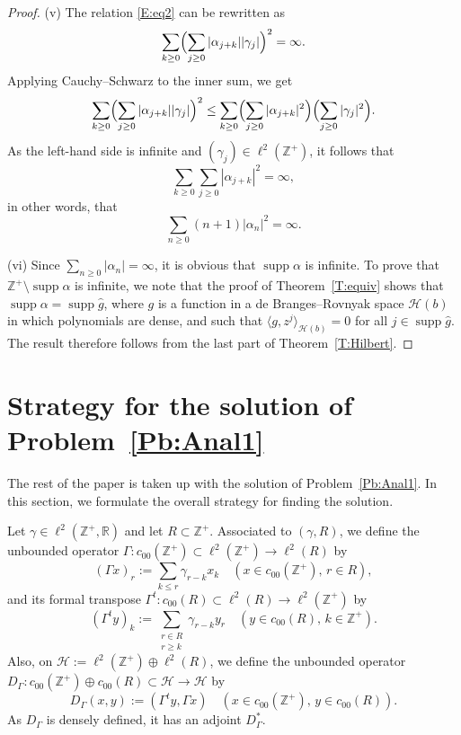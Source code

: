 \documentclass[11pt,reqno]{amsart}
\theoremstyle{plain}
\theoremstyle{definition}
\theoremstyle{remark}
\newcommand{\cH}{\mathcal{H}}
\newcommand{\RR}{\mathbb{R}}
\newcommand{\ZZ}{\mathbb{Z}}
\renewcommand{\hat}{\widehat}
\DeclareMathOperator{\supp}{supp}
\begin{document}
\begin{proof}
(v)  The relation \eqref{E:eq2} can be rewritten as
\[
\sum_{k\ge0}\Bigl(\sum_{j\ge0}|\alpha_{j+k}||\gamma_j|\Bigr)^2=\infty.
\]
Applying Cauchy--Schwarz to the inner sum, we get
\[
\sum_{k\ge0}\Bigl(\sum_{j\ge0}|\alpha_{j+k}||\gamma_j|\Bigr)^2
\le
\sum_{k\ge0}\Bigl(\sum_{j\ge0}|\alpha_{j+k}|^2\Bigr)\Bigl(\sum_{j\ge0}|\gamma_j|^2\Bigr).
\]
As the left-hand side is infinite and  $(\gamma_j)\in\ell^2(\ZZ^+)$,
it follows that
\[
\sum_{k\ge0}\sum_{j\ge0}|\alpha_{j+k}|^2=\infty,
\]
in other words, that
\[
\sum_{n\ge0}(n+1)|\alpha_{n}|^2=\infty.
\]

 
(vi) Since $\sum_{n\ge0}|\alpha_n|=\infty$, it is obvious that $\supp\alpha$ is infinite.
To prove that $\ZZ^+\setminus\supp\alpha$ is infinite,
we note that the proof of Theorem~\ref{T:equiv} shows that
$\supp\alpha=\supp\hat{g}$, where 
 $g$ is a function in a de Branges--Rovnyak space $\cH(b)$ 
in which polynomials are dense, and such that
 $\langle g,z^j\rangle_{\cH(b)}=0$ for all $j\in \supp\hat{g}$.
The result therefore follows from the last part of  Theorem~\ref{T:Hilbert}.   
\end{proof}




\section{Strategy for the solution of Problem~\ref{Pb:Anal1}}\label{S:strategy}

The rest of the paper is taken up with the solution
of Problem~\ref{Pb:Anal1}.
In this section, we formulate the overall strategy
for finding the solution.



Let $\gamma\in\ell^2(\ZZ^+,\RR)$ and let $R\subset\ZZ^+$.
Associated to $(\gamma,R)$, we define the unbounded
operator
$\Gamma:c_{00}(\ZZ^+)\subset\ell^2(\ZZ^+)\to\ell^2(R)$ by
\[
(\Gamma x)_r:=\sum_{k\le r}\gamma_{r-k}x_k
\quad(x\in c_{00}(\ZZ^+),\,r\in R),
\]
and its formal transpose 
$\Gamma^t:c_{00}(R)\subset\ell^2(R)\to\ell^2(\ZZ^+)$ by
\[
(\Gamma^t y)_k:=\sum_{\substack{r\in R\\r\ge k}}\gamma_{r-k}y_r
\quad(y\in c_{00}(R),\, k\in \ZZ^+).
\]
Also, on $\cH:=\ell^2(\ZZ^+)\oplus \ell^2(R)$, we define the unbounded operator $D_\Gamma:c_{00}(\ZZ^+)\oplus c_{00}(R)\subset\cH\to \cH$ by
\[
D_\Gamma(x,y):=(\Gamma^t y,\Gamma x)\quad(x\in c_{00}(\ZZ^+),\, y\in c_{00}(R)).
\]
As $D_\Gamma$ is densely defined, it has an adjoint $D_\Gamma^*$.
\end{document}
